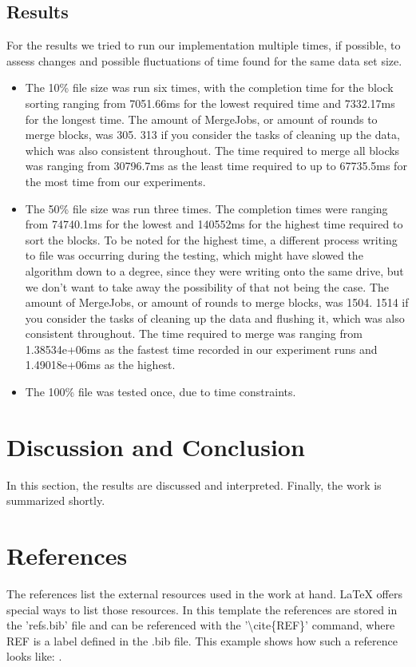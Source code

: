 \documentclass[twocolumn]{article}
\begin{document}
\subsection{Results}%
\label{sub:Results}
For the results we tried to run our implementation multiple times, if possible, to assess changes and possible fluctuations of time found for the same data set size.\\
\begin{itemize}
	\item The 10\% file size was run six times, with the completion time for the block sorting ranging from 7051.66ms for the lowest required time and 7332.17ms for the longest time. The amount of MergeJobs, or amount of rounds to merge blocks, was 305. 313 if you consider the tasks of cleaning up the data, which was also consistent throughout. The time required to merge all blocks was ranging from 30796.7ms as the least time required to up to 67735.5ms for the most time from our experiments.
	\item The 50\% file size was run three times. The completion times were ranging from 74740.1ms for the lowest and 140552ms for the highest time required to sort the blocks. To be noted for the highest time, a different process writing to file was occurring during the testing, which might have slowed the algorithm down to a degree, since they were writing onto the same drive, but we don't want to take away the possibility of that not being the case. The amount of MergeJobs, or amount of rounds to merge blocks, was 1504. 1514 if you consider the tasks of cleaning up the data and flushing it, which was also consistent throughout. The time required to merge was ranging from 1.38534e+06ms as the fastest time recorded in our experiment runs and 1.49018e+06ms as the highest. 
	\item The 100\% file was tested once, due to time constraints.
\end{itemize}

\section{Discussion and Conclusion}
In this section, the results are discussed and interpreted. Finally, the work is summarized shortly.

\section{References}
The references list the external resources used in the work at hand. \LaTeX$ $  offers special ways to list those resources. In this template the references are stored in the 'refs.bib' file and can be referenced with the '\textbackslash$ $cite\{REF\}' command, where REF is a label defined in the .bib file. This example shows how such a reference looks like: \cite{exa}.



\end{document}
